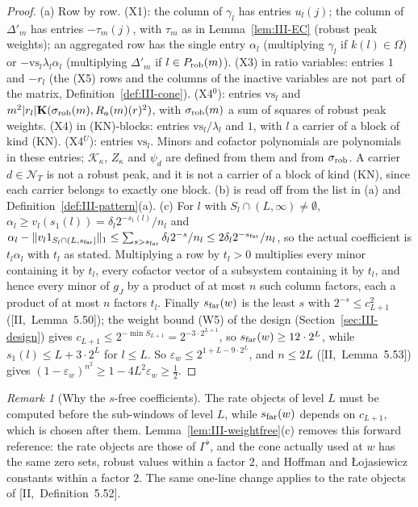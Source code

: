 \documentclass[10pt]{amsart}
\theoremstyle{definition}
\theoremstyle{remark}
\newtheorem{remark}[theorem]{Remark}
\begin{document}
\begin{proof}
(a) Row by row.  (X1): the column of $\gamma_l$ has entries $u_l(j)$; the
column of $\Delta'_m$ has entries $-\tau_m(j)$, with $\tau_m$ as in
Lemma~\ref{lem:III-EC} (robust peak weights); an aggregated row has the single
entry $\alpha_l$ (multiplying $\gamma_l$ if $k(l)\in\Omega$) or $-\mathrm{vs}_l
\lambda_l\alpha_l$ (multiplying $\Delta'_m$ if $l\in P_{\rm rob}(m)$).  (X3) in
ratio variables: entries $1$ and $-r_l$ (the (X5) rows and the columns of
the inactive variables are not part of the matrix,
Definition~\ref{def:III-cone}).  (X4$^0$): entries
$\mathrm{vs}_l$ and $m^2|r_l|\mathbf K(\sigma_{\rm rob}(m),R_a(m)(r)^2)$, with
$\sigma_{\rm rob}(m)$ a sum of squares of robust peak weights.  (X4) in
(KN)-blocks: entries $\mathrm{vs}_l/\lambda_l$ and $1$, with $l$ a carrier of a
block of kind (KN).  (X4$^U$): entries $\mathrm{vs}_l$.  Minors and cofactor
polynomials are polynomials in these entries; $\mathcal K_\kappa$, $Z_\kappa$ and
$\psi_d$ are defined from them and from $\sigma_{\rm rob}$.  A carrier $d\in
\mathcal N_T$ is not a robust peak, and it is not a carrier of a block of
kind (KN), since each carrier belongs to exactly one block.  (b) is read off
from the list in (a) and Definition~\ref{def:III-pattern}(a).  (c) For $l$
with $S_l\cap(L,\infty)\ne\emptyset$, $\alpha_l\ge v_l(s_1(l))=\delta_l2^{-s_1(l)}/
n_l$ and $\alpha_l-\|v_l1_{S_l\cap(L,s_{\rm far}]}\|_1\le\sum_{s>s_{\rm far}}
\delta_l2^{-s}/n_l\le2\delta_l2^{-s_{\rm far}}/n_l$, so the actual coefficient
is $t_l\alpha_l$ with $t_l$ as stated.  Multiplying a row by $t_l>0$
multiplies every minor containing it by $t_l$, every cofactor vector of a
subsystem containing it by $t_l$, and hence every minor of $g_J$ by a
product of at most $n$ such column factors, each a product of at most $n$
factors $t_l$.  Finally $s_{\rm far}(w)$ is the least $s$ with $2^{-s}\le
c_{L+1}^2$ ([II,~Lemma~5.50]); the weight bound (W5) of the design
(Section~\ref{sec:III-design}) gives $c_{L+1}\le2^{-\min S_{L+1}}=2^{-3\cdot
2^{L+1}}$, so $s_{\rm far}(w)\ge12\cdot2^L$, while $s_1(l)\le L+3\cdot2^L$ for
$l\le L$.  So $\varepsilon_w\le2^{1+L-9\cdot2^L}$, and $n\le2L$
([II,~Lemma~5.53]) gives $(1-\varepsilon_w)^{n^2}\ge1-4L^2\varepsilon_w\ge\frac12$.
\end{proof}

\begin{remark}[Why the $s$-free coefficients]\label{rem:III-sfar}
The rate objects of level $L$ must be computed before the sub-windows of
level $L$, while $s_{\rm far}(w)$ depends on $c_{L+1}$, which is chosen after
them.  Lemma~\ref{lem:III-weightfree}(c) removes this forward reference: the
rate objects are those of $\Gamma^\flat$, and the cone actually used at $w$ has
the same zero sets, robust values within a factor $2$, and Hoffman and
{\L}ojasiewicz constants within a factor $2$.  The same one-line change
applies to the rate objects of [II,~Definition~5.52].
\end{remark}
\end{document}
